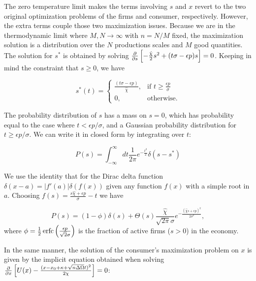 The zero temperature limit makes the terms involving $s$ and $x$ revert to the two original optimization problems of the firms and consumer, respectively. However, the extra terms couple those two maximization issues. Because we are in the thermodynamic limit where $M, N \to \infty$ with $n = N/M$ fixed, the maximization solution is a distribution over the $N$ productions scales and $M$ good quantities. The solution for $s^*$ is obtained by solving  $\frac{\partial}{\partial s}
\left[-\frac{\hat{\chi}}{2}s^2 + (t \sigma - \epsilon p) s\right] =
0$. Keeping in mind the constraint that $s\geq 0$, we have

\begin{equation}
  \label{eq:s_ast}
  s^*(t) =
  \begin{cases}
    \frac{(t\sigma - \epsilon p)}{\hat{\chi}}, & \text{if } t \geq \frac{\epsilon
      p}{\sigma} \\
    0, & \text{otherwise.}
  \end{cases}
\end{equation}

The probability distribution of $s$ has a mass on $s=0$, which has probability equal to the case where $t < \epsilon p / \sigma$, and a Gaussian probability distribution for $t \geq \epsilon p /
\sigma$. We can write it in closed form by integrating over $t$:

\begin{equation}
  \label{eq:rle_64}
  P(s) = \int_{-\infty}^\infty dt \frac{1}{2\pi}
  e^{-\frac{t^2}{2}} \delta (s - s^*)
\end{equation}

We use the identity that for the Dirac delta function $\delta(x - a) = |f'(a)|\delta(f(x))$ given any function $f(x)$ with a simple root in $a$. Choosing $f(s) = \frac{s\hat{\chi} + \epsilon p}{\sigma} - t$ we have

\begin{equation}
  \label{eq:rle_63}
  P(s) = (1 - \phi) \delta(s) + \Theta(s) \frac{\hat{\chi}}{\sqrt{2\pi}
    \sigma} e^{-\frac{(\hat{\chi}s + \epsilon p)^2}{2\sigma^2}},
\end{equation}
where $\phi = \frac{1}{2} \operatorname{erfc}\left(\frac{\epsilon p}{\sqrt{2} \sigma}\right)$ is the fraction of active firms ($s > 0$) in the economy.
    
In the same manner, the solution of the consumer's maximization problem on $x$ is given by the implicit equation obtained when solving $\frac{\partial}{\partial x} \left[U(x) - \frac{(x - x_0 + \kappa + \sqrt{n\Delta\Omega}t)^2}{2\chi}\right] = 0$:

